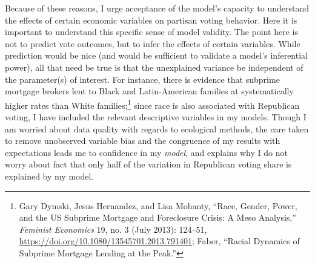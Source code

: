\documentclass[12pt,oneside]{psthesis}
\begin{document}
Because of these reasons, I urge acceptance of the model's capacity to understand the effects of certain economic variables on partisan voting behavior.
Here it is important to understand this specific sense of model validity.
The point here is not to predict vote outcomes, but to infer the effects of certain variables.
While prediction would be nice (and would be sufficient to validate a model's inferential power), all that need be true is that the unexplained variance be independent of the parameter(s) of interest.
For instance, there is evidence that subprime mortgage brokers lent to Black and Latin-American families at systematically higher rates than White families;\footnote{Gary Dymski, Jesus Hernandez, and Lisa Mohanty, ``Race, Gender, Power, and the US Subprime Mortgage and Foreclosure Crisis: A Meso Analysis,'' \emph{Feminist Economics} 19, no. 3 (July 2013): 124--51, \url{https://doi.org/10.1080/13545701.2013.791401}; Faber, ``Racial Dynamics of Subprime Mortgage Lending at the Peak.''} since race is also associated with Republican voting, I have included the relevant descriptive variables in my models.
Though I am worried about data quality with regards to ecological methods, the care taken to remove unobserved variable bias and the congruence of my results with expectations leads me to confidence in my \emph{model}, and explains why I do not worry about fact that only half of the variation in Republican voting share is explained by my model.
\end{document}
